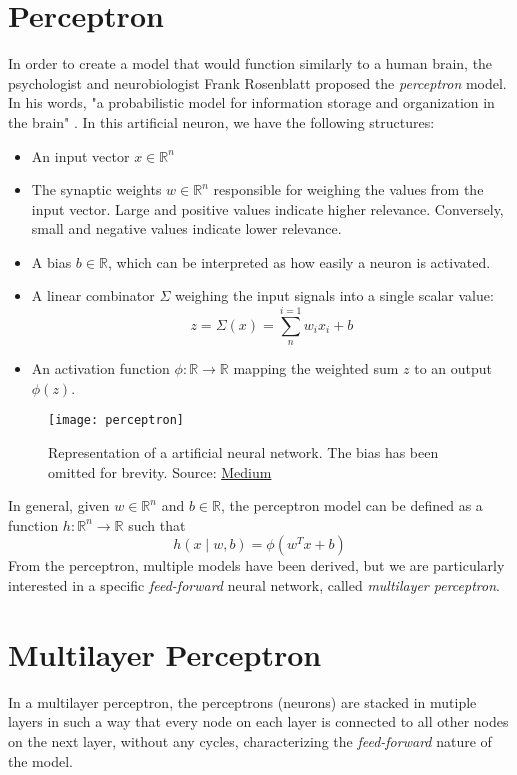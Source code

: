 \section{Perceptron}
In order to create a model that would function similarly to a human brain, the psychologist and neurobiologist Frank Rosenblatt proposed the \textit{perceptron} model. In his words, "a probabilistic model for information storage and organization in the brain" \cite{rosenblatt:perceptron}.
In this artificial neuron, we have the following structures:
\begin{itemize}
    \item An input vector $x \in \mathbb{R}^n$
    \item The synaptic weights $w \in \mathbb{R}^n$ responsible for weighing the values from the input vector. Large and positive values indicate higher relevance. Conversely, small and negative values indicate lower relevance.
    \item A bias $b \in \mathbb{R}$, which can be interpreted as how easily a neuron is activated.
    \item A linear combinator $\Sigma$ weighing the input signals into a single scalar value:
    \[
        z = \Sigma(x) = \sum^{i=1}_{n}w_i x_i + b   
    \]
    \item An activation function $\phi \colon \mathbb{R} \to \mathbb{R}$ mapping the weighted sum $z$ to an output $\phi(z)$.
\end{itemize}
\begin{figure}[H]
    \texttt{[image: perceptron]}
    \caption{Representation of a artificial neural network. The bias has been omitted for brevity. Source: \href{https://medium.com/@stanleydukor/neural-representation-of-and-or-not-xor-and-xnor-logic-gates-perceptron-algorithm-b0275375fea1}{Medium}}
\end{figure}
In general, given $w \in \mathbb{R}^n$ and $b \in \mathbb{R}$, the perceptron model can be defined as a function $h \colon \mathbb{R}^n \to \mathbb{R}$ such that
\[
    h(x \mid w, b) = \phi(w^Tx + b)    
\]
From the perceptron, multiple models have been derived, but we are particularly interested in a specific \textit{feed-forward} neural network, called \textit{multilayer perceptron}.

\section{Multilayer Perceptron}
In a multilayer perceptron, the perceptrons (neurons) are stacked in mutiple layers in such a way that every node on each layer is connected to all other nodes on the next layer, without any cycles, characterizing the \textit{feed-forward} nature of the model.


